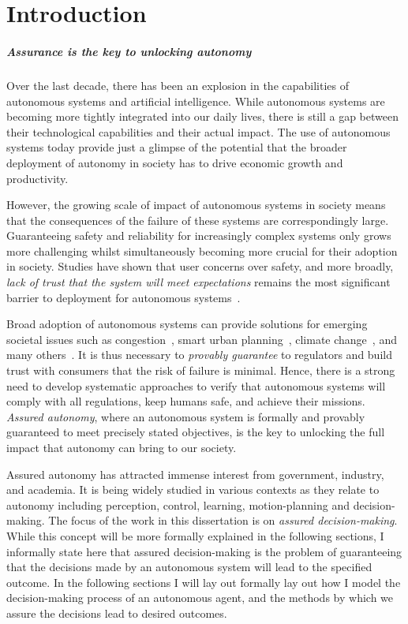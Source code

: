 \chapter{Introduction}

\paragraph{Assurance is the key to unlocking autonomy} Over the last decade, there has been an explosion in the capabilities of autonomous systems and artificial intelligence. While autonomous systems are becoming more tightly integrated into our daily lives, there is still a gap between their technological capabilities and their actual impact. The use of autonomous systems today provide just a glimpse of the potential that the broader deployment of autonomy in society has to drive economic growth and productivity. 



However, the growing scale of impact of autonomous systems in society means that the consequences of the failure of these systems are correspondingly large. Guaranteeing safety and reliability for increasingly complex systems only grows more challenging whilst simultaneously becoming more crucial for their adoption in society. Studies have shown that user concerns over safety, and more broadly, \emph{lack of trust that the system will meet expectations} remains the most significant barrier to deployment for autonomous systems~\cite{KAUR201887,BEZAI202165,MOLNAR2018319}.  


Broad adoption of autonomous systems can provide solutions for emerging societal issues such as congestion~\cite{LIORIS2017292,8734238}, smart urban planning~\cite{GULSRUD201885,NITOSLAWSKI2019101770}, climate change~\cite{KOLOKOTSA2017101,goddard2021global}, and many others~\cite{DUONG2020355}. It is thus necessary to \emph{provably guarantee} to regulators and build trust with consumers that the risk of failure is minimal. Hence, there is a strong need to develop systematic approaches to verify that autonomous systems will comply with all regulations, keep humans safe, and achieve their missions. \emph{Assured autonomy}, where an autonomous system is formally and provably guaranteed to meet precisely stated objectives, is the key to unlocking the full impact that autonomy can bring to our society. 

Assured autonomy has attracted immense interest from government, industry, and academia. It is being widely studied in various contexts as they relate to autonomy including perception, control, learning, motion-planning and decision-making. The focus of the work in this dissertation is on \emph{assured decision-making}. While this concept will be more formally explained in the following sections, I informally state here that assured decision-making is the problem of guaranteeing that the decisions made by an autonomous system will lead to the specified outcome. In the following sections I will lay out formally lay out how I model the decision-making process of an autonomous agent, and the methods by which we assure the decisions lead to desired outcomes. 


